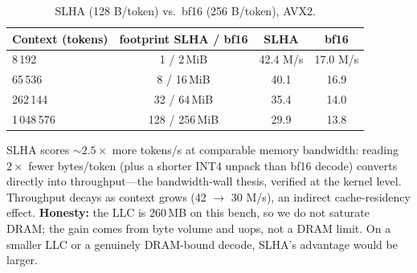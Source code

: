 \documentclass[11pt]{article}
\theoremstyle{plain}
\theoremstyle{definition}
\begin{document}
\begin{table}[t]
\centering
\caption{SLHA (128 B/token) vs.\ bf16 (256 B/token), AVX2.}
\label{tab:membw}
\small
\begin{tabular}{@{}lccc@{}}
\toprule
Context (tokens) & footprint SLHA / bf16 & SLHA & bf16 \\
\midrule
8\,192      & 1 / 2\,MiB    & 42.4 M/s & 17.0 M/s \\
65\,536     & 8 / 16\,MiB   & 40.1 & 16.9 \\
262\,144    & 32 / 64\,MiB  & 35.4 & 14.0 \\
1\,048\,576 & 128 / 256\,MiB & 29.9 & 13.8 \\
\bottomrule
\end{tabular}
\end{table}

SLHA scores $\sim\!2.5\times$ more tokens/s at comparable memory
bandwidth: reading $2\times$ fewer bytes/token (plus a shorter INT4
unpack than bf16 decode) converts directly into throughput---the
bandwidth-wall thesis, verified at the kernel level. Throughput decays as
context grows (42 $\to$ 30 M/s), an indirect cache-residency effect.
\textbf{Honesty:} the LLC is 260\,MB on this bench, so we do not saturate
DRAM; the gain comes from byte volume and uops, not a DRAM limit. On a
smaller LLC or a genuinely DRAM-bound decode, SLHA's advantage would be
larger.
\end{document}
